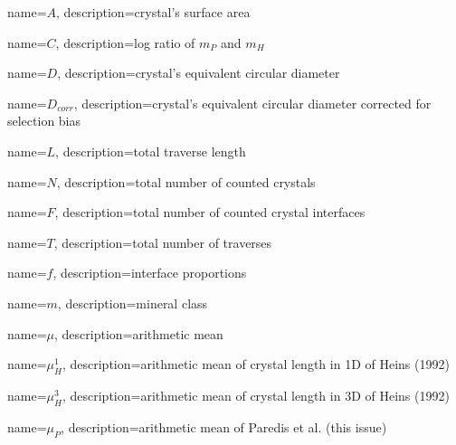 


{
    name={\ensuremath{A}},
    description={crystal's surface area}
}

{
    name={\ensuremath{C}},
    description={log ratio of \(m_{P}\) and \(m_{H}\)}
}

{
    name={\ensuremath{D}},
    description={crystal's equivalent circular diameter}
}

{
    name={\ensuremath{D_{corr}}},
    description={crystal's equivalent circular diameter corrected for selection bias}
}

{
    name={\ensuremath{L}},
    description={total traverse length}
}

{
    name={\ensuremath{N}},
    description={total number of counted crystals}
}

{
    name={\ensuremath{F}},
    description={total number of counted crystal interfaces}
}

{
    name={\ensuremath{T}},
    description={total number of traverses}
}

{
    name=\ensuremath{f},
    description={interface proportions}
}

{
    name={\ensuremath{m}},
    description={mineral class}
}


{
    name={\ensuremath{\mu}},
    description={arithmetic mean}
}

{
    name={\ensuremath{\mu_{H}^{1}}},
    description={arithmetic mean of crystal length in 1D of Heins (1992)}
}

{
    name={\ensuremath{\mu_{H}^{3}}},
    description={arithmetic mean of crystal length in 3D of Heins (1992)}
}

{
    name={\ensuremath{\mu_{P}}},
    description={arithmetic mean of Paredis et al. (this issue)}
}

